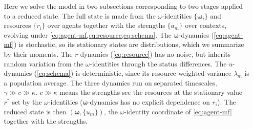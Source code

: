 \documentclass[
  aps,prx,
  reprint,
  superscriptaddress,
  nofootinbib,
  longbibliography
]{revtex4-2}
\newcommand{\w}{\bm{\omega}}
\begin{document}
\noindent Here we solve the model in two subsections corresponding to two stages applied to a reduced state.
The full state is made from the $\omega$-identities $\{\w_i\}$ and resources $\{r_i\}$ over agents together with the strengths $\{u_m\}$ over contexts, evolving under \cref{eq:agent-mf,eq:resource,eq:schema}.
The $\w$-dynamics (\cref{eq:agent-mf}) is stochastic, so its stationary states are distributions, which we summarize by their moments. The $r$-dynamics (\cref{eq:resource}) has no noise, but inherits random variation from the $\omega$-identities through the status differences. The $u$-dynamics (\cref{eq:schema}) is deterministic, since its resource-weighted variance $\lambda_m$ is a population average.
The three dynamics run on separated timescales, $\gamma\gg c\gg\kappa$. $c\gg\kappa$ means the strengths see the resources at the stationary value $r^*$ set by the $\omega$-identities ($\w$-dynamics has no explicit dependence on $r_i$). The reduced state is then $(\w,\{u_m\})$, the $\omega$-identity coordinate of \cref{eq:agent-mf} together with the strengths.
\end{document}
